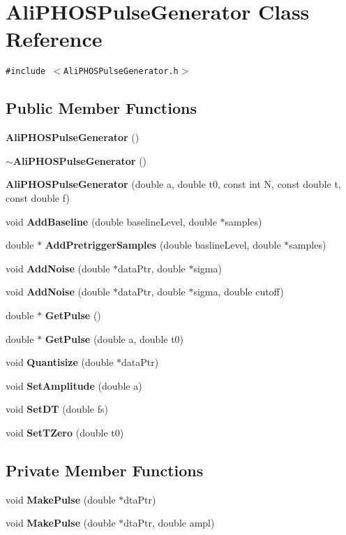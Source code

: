 \section{Ali\-PHOSPulse\-Generator Class Reference}
\label{classAliPHOSPulseGenerator}
{\tt \#include $<$Ali\-PHOSPulse\-Generator.h$>$}

\subsection*{Public Member Functions}
\begin{CompactItemize}
\item 
{\bf Ali\-PHOSPulse\-Generator} ()
\item 
{\bf $\sim$Ali\-PHOSPulse\-Generator} ()
\item 
{\bf Ali\-PHOSPulse\-Generator} (double a, double t0, const int N, const double t, const double f)
\item 
void {\bf Add\-Baseline} (double baseline\-Level, double $\ast$samples)
\item 
double $\ast$ {\bf Add\-Pretrigger\-Samples} (double basline\-Level, double $\ast$samples)
\item 
void {\bf Add\-Noise} (double $\ast$data\-Ptr, double $\ast$sigma)
\item 
void {\bf Add\-Noise} (double $\ast$data\-Ptr, double $\ast$sigma, double cutoff)
\item 
double $\ast$ {\bf Get\-Pulse} ()
\item 
double $\ast$ {\bf Get\-Pulse} (double a, double t0)
\item 
void {\bf Quantisize} (double $\ast$data\-Ptr)
\item 
void {\bf Set\-Amplitude} (double a)
\item 
void {\bf Set\-DT} (double fs)
\item 
void {\bf Set\-TZero} (double t0)
\end{CompactItemize}
\subsection*{Private Member Functions}
\begin{CompactItemize}
\item 
void {\bf Make\-Pulse} (double $\ast$dta\-Ptr)
\item 
void {\bf Make\-Pulse} (double $\ast$dta\-Ptr, double ampl)
\end{CompactItemize}
